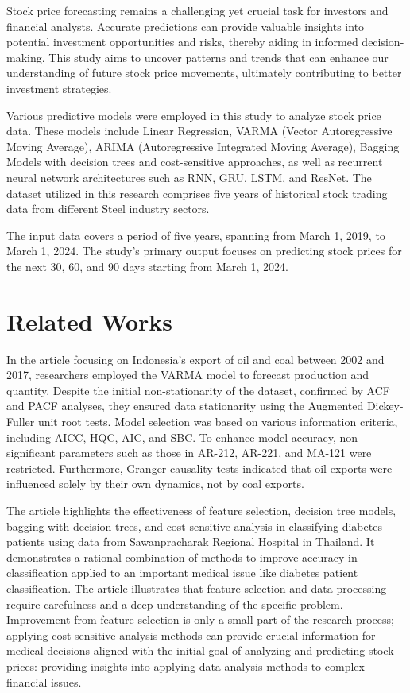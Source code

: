 \documentclass{ieeeojies}
\begin{document}
Stock price forecasting remains a challenging yet crucial task for investors and financial analysts. Accurate predictions can provide valuable insights into potential investment opportunities and risks, thereby aiding in informed decision-making. This study aims to uncover patterns and trends that can enhance our understanding of future stock price movements, ultimately contributing to better investment strategies.

Various predictive models were employed in this study to analyze stock price data. These models include Linear Regression, VARMA (Vector Autoregressive Moving Average), ARIMA (Autoregressive Integrated Moving Average), Bagging Models with decision trees and cost-sensitive approaches, as well as recurrent neural network architectures such as RNN, GRU, LSTM, and ResNet. The dataset utilized in this research comprises five years of historical stock trading data from different Steel industry sectors.

The input data covers a period of five years, spanning from March 1, 2019, to March 1, 2024. The study's primary output focuses on predicting stock prices for the next 30, 60, and 90 days starting from March 1, 2024.

\section{Related Works}

In the article \cite{b1} focusing on Indonesia's export of oil and coal between 2002 and 2017, researchers employed the VARMA model to forecast production and quantity. Despite the initial non-stationarity of the dataset, confirmed by ACF and PACF analyses, they ensured data stationarity using the Augmented Dickey-Fuller unit root tests. Model selection was based on various information criteria, including AICC, HQC, AIC, and SBC. To enhance model accuracy, non-significant parameters such as those in AR-212, AR-221, and MA-121 were restricted. Furthermore, Granger causality tests indicated that oil exports were influenced solely by their own dynamics, not by coal exports.

The article \cite{b2} highlights the effectiveness of feature selection, decision tree models, bagging with decision trees, and cost-sensitive analysis in classifying diabetes patients using data from Sawanpracharak Regional Hospital in Thailand. It demonstrates a rational combination of methods to improve accuracy in classification applied to an important medical issue like diabetes patient classification. The article illustrates that feature selection and data processing require carefulness and a deep understanding of the specific problem. Improvement from feature selection is only a small part of the research process; applying cost-sensitive analysis methods can provide crucial information for medical decisions aligned with the initial goal of analyzing and predicting stock prices: providing insights into applying data analysis methods to complex financial issues.\\
\end{document}
